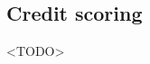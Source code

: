 \documentclass{sig-alternate-05-2015}
\begin{document}
	\subsection{Credit scoring}
	<TODO>
%	
\end{document}
